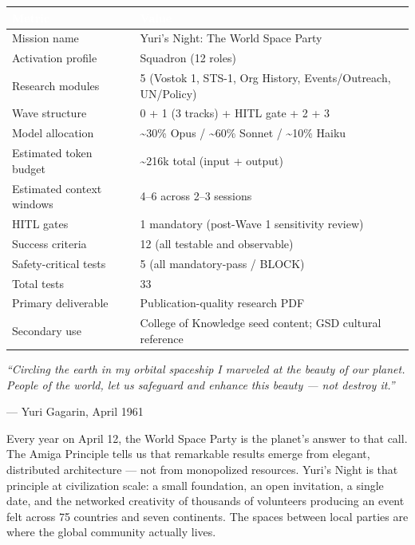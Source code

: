 \documentclass[11pt,letterpaper]{article}
\newcommand{\tableheader}[1]{\textbf{\sffamily\textcolor{white}{#1}}}
\begin{document}
\begin{center}
\begin{tabularx}{\textwidth}{L{5cm}X}
\toprule
{}
\tableheader{Metric} & \tableheader{Value} \\
\midrule
Mission name & Yuri's Night: The World Space Party \\
Activation profile & Squadron (12 roles) \\
Research modules & 5 (Vostok 1, STS-1, Org History, Events/Outreach, UN/Policy) \\
Wave structure & 0 + 1 (3 tracks) + HITL gate + 2 + 3 \\
Model allocation & \textasciitilde30\% Opus / \textasciitilde60\% Sonnet / \textasciitilde10\% Haiku \\
Estimated token budget & \textasciitilde216k total (input + output) \\
Estimated context windows & 4--6 across 2--3 sessions \\
HITL gates & 1 mandatory (post-Wave 1 sensitivity review) \\
Success criteria & 12 (all testable and observable) \\
Safety-critical tests & 5 (all mandatory-pass / BLOCK) \\
Total tests & 33 \\
Primary deliverable & Publication-quality research PDF \\
Secondary use & College of Knowledge seed content; GSD cultural reference \\
\bottomrule
\end{tabularx}
\end{center}

\vspace{2em}

\begin{quotebox}
\textit{``Circling the earth in my orbital spaceship I marveled at the beauty of our planet. People of the world, let us safeguard and enhance this beauty — not destroy it.''}

\vspace{0.5em}
\hfill — Yuri Gagarin, April 1961

\vspace{1em}
Every year on April 12, the World Space Party is the planet's answer to that call. The Amiga Principle tells us that remarkable results emerge from elegant, distributed architecture — not from monopolized resources. Yuri's Night is that principle at civilization scale: a small foundation, an open invitation, a single date, and the networked creativity of thousands of volunteers producing an event felt across 75 countries and seven continents. The spaces between local parties are where the global community actually lives.
\end{quotebox}
\end{document}
